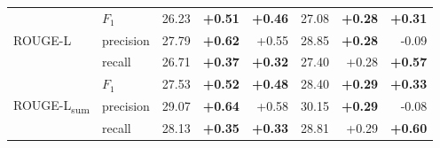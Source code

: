 \begin{table}[ht!]
\begin{tabular}{llrrrrrr}
\midrule
\multirow{3}{*}{ROUGE-L} & $F_1$ &  26.23 &         \textbf{+0.51} &         \textbf{+0.46} &  27.08 &         \textbf{+0.28} &         \textbf{+0.31} \\
           & precision &  27.79 &         \textbf{+0.62} &         +0.55 &  28.85 &         \textbf{+0.28} &        -0.09 \\
           & recall &  26.71 &         \textbf{+0.37} &         \textbf{+0.32} &  27.40 &         +0.28 &         \textbf{+0.57} \\
\midrule
\multirow{3}{*}{ROUGE-L\textsubscript{sum}} & $F_1$ &  27.53 &         \textbf{+0.52} &         \textbf{+0.48} &  28.40 &         \textbf{+0.29} &         \textbf{+0.33} \\
           & precision &  29.07 &         \textbf{+0.64} &         +0.58 &  30.15 &         \textbf{+0.29} &        -0.08 \\
           & recall &  28.13 &         \textbf{+0.35} &         \textbf{+0.33} &  28.81 &         +0.29 &         \textbf{+0.60} \\
\bottomrule
\end{tabular}
\end{table}







